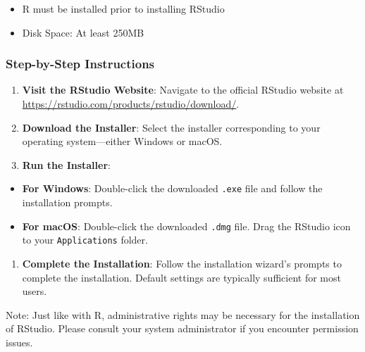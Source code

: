 \documentclass[
]{book}
\newenvironment{Shaded}{\begin{snugshade}}{\end{snugshade}}
\newcommand{\NormalTok}[1]{#1}
\providecommand{\tightlist}{%
  \setlength{\itemsep}{0pt}\setlength{\parskip}{0pt}}
\begin{document}
\begin{itemize}
\tightlist
\item
  R must be installed prior to installing RStudio
\item
  Disk Space: At least 250MB
\end{itemize}

\hypertarget{step-by-step-instructions-2}{%
\subsubsection*{Step-by-Step Instructions}\label{step-by-step-instructions-2}}

\begin{enumerate}
\def\labelenumi{\arabic{enumi}.}
\item
  \textbf{Visit the RStudio Website}: Navigate to the official RStudio website at \url{https://rstudio.com/products/rstudio/download/}.
\item
  \textbf{Download the Installer}: Select the installer corresponding to your operating system---either Windows or macOS.
\item
  \textbf{Run the Installer}:
\end{enumerate}

\begin{itemize}
\tightlist
\item
  \textbf{For Windows}: Double-click the downloaded \texttt{.exe} file and follow the installation prompts.
\item
  \textbf{For macOS}: Double-click the downloaded \texttt{.dmg} file. Drag the RStudio icon to your \texttt{Applications} folder.
\end{itemize}

\begin{enumerate}
\def\labelenumi{\arabic{enumi}.}
\setcounter{enumi}{3}
\tightlist
\item
  \textbf{Complete the Installation}: Follow the installation wizard's prompts to complete the installation. Default settings are typically sufficient for most users.
\end{enumerate}

\begin{Shaded}
\begin{Highlighting}[]
\NormalTok{Note: Just like with R, administrative rights may be necessary for the installation of RStudio. Please consult your system administrator if you encounter permission issues.}
\end{Highlighting}
\end{Shaded}
\end{document}
